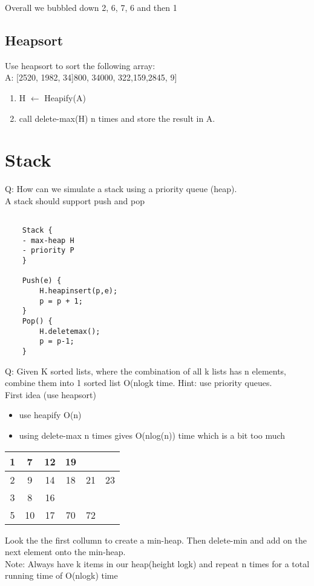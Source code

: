 \documentclass[12pt]{article}
\begin{document}
	Overall we bubbled down 2, 6, 7, 6 and then 1\\
	
	\subsection*{Heapsort}
	
	Use heapsort to sort the following array:\\
	A: [2520, 1982, 34]800, 34000, 322,159,2845, 9]\\
	\begin{enumerate}
		\item H $\leftarrow$ Heapify(A)
		\item call delete-max(H) n times and store the result in A.
	\end{enumerate}
	
	\section*{Stack}
	Q: How can we simulate a stack using a priority queue (heap).\\
	
	A stack should support push and pop\\
	
	\begin{verbatim}

	Stack {
	- max-heap H
	- priority P
	}
	
	Push(e) {
	    H.heapinsert(p,e);
	    p = p + 1;
	}
	Pop() {
	    H.deletemax();
	    p = p-1;
	}
	\end{verbatim}
	
	Q: Given K sorted lists, where the combination of all k lists has n elements, combine them into 1 sorted list O(nlogk time. Hint: use priority queues.\\
	
	First idea (use heapsort) \\
	\begin{itemize}
		\item use heapify O(n)
		\item using delete-max n times gives O(nlog(n)) time which is a bit too much
	\end{itemize}
	
	\begin{tabular}{c | c | c | c | c | c}
		1 & 7 & 12 & 19 & & \\ \hline
		2 & 9 & 14 & 18 & 21 & 23 \\ \hline
		3 & 8 & 16 & & & \\ \hline
		5 & 10 & 17 & 70 & 72 & \\ \hline
	\end{tabular}
	
	Look the the first collumn to create a min-heap. Then delete-min and add on the next element onto the min-heap.\\
	
	Note: Always have k items in our heap(height logk) and repeat n times for a total running time of O(nlogk) time\\

	
	
	
	
\end{document}
